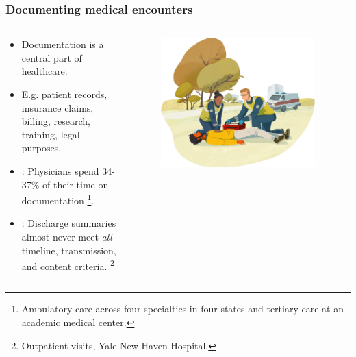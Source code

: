 \begin{frame}
    \frametitle{Documenting medical encounters}
    \begin{columns}
        \begin{column}{0.5\textwidth}
            \begin{itemize}
                \item <1,2> Documentation is a central part of healthcare.
                \item <1,2> E.g. patient records, insurance claims, billing, research, training, legal purposes.
                \vspace{1em}
                \item <2> : Physicians spend 34-37\% of their time on documentation \cite{joukes_time_2018, tipping_where_2010, sinsky_allocation_2016}\footnote<2>{Ambulatory care across four specialties in four states and tertiary care at an academic medical center.}.
                \item <2> : Discharge summaries almost never meet \emph{all} timeline, transmission, and content criteria. \cite{horwitz_comprehensive_2013}\footnote<2>{Outpatient visits, Yale-New Haven Hospital.}
            \end{itemize}
        \end{column}
        \begin{column}{0.5\textwidth}
            \begin{figure}
                \centering
                \includegraphics[width=0.95\textwidth]{figures/corti_sketch_responders.png}
            \end{figure}
        \end{column}
    \end{columns}
\end{frame}
    

